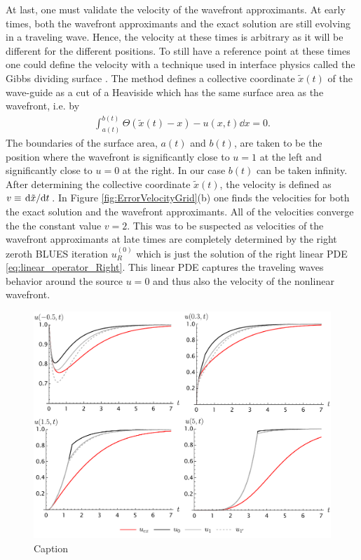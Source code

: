 \documentclass[amsmath,amssymb,amsfonts,aps,pre,preprint,superscriptaddress,bibnotes,showpacs,showkeys,longbibliography]{revtex4-1}
\begin{document}
At last, one must validate the velocity of the wavefront approximants. At early times, both the wavefront approximants and the exact solution are still evolving in a traveling wave. Hence, the velocity at these times is arbitrary as it will be different for the different positions. To still have a reference point at these times one could define the velocity with a technique used in interface physics called the Gibbs dividing surface \cite{gibbs1928collected,Lamorgese2017}. The method defines a collective coordinate $\tilde{x}(t)$ of the wave-guide as a cut of a Heaviside which has the same surface area as the wavefront, i.e. by
\begin{align}\label{eq:Gibbs_dividing_surface}
    \int_{a(t)}^{b(t)}  \Theta(\tilde{x}(t)-x)-u(x, t)\dd{x}  =0.
\end{align}
The boundaries of the surface area, $a(t)$ and $b(t)$, are taken to be the position where the wavefront is significantly close to $u=1$ at the left and significantly close to $u=0$ at the right. In our case $b(t)$ can be taken infinity. After determining the collective coordinate $\tilde{x}(t)$, the velocity is defined as $v\equiv \dv*{\tilde{x}}{t}$. In Figure \ref{fig:ErrorVelocityGrid}(b) one finds the velocities for both the exact solution and the wavefront approximants. All of the velocities converge the the constant value $v=2$. This was to be suspected as velocities of the wavefront approximants at late times are completely determined by the right zeroth BLUES iteration $u^{(0)}_R$ which is just the solution of the right linear PDE \eqref{eq:linear_operator_Right}. This linear PDE captures the traveling waves behavior around the source $u=0$ and thus also the velocity of the nonlinear wavefront.

\begin{figure}[t]
    \centering
    \includegraphics[width=\linewidth]{Figures/GridSimoide.pdf}
    \caption{Caption}
    \label{fig:GridSimoide}
\end{figure}
\end{document}

